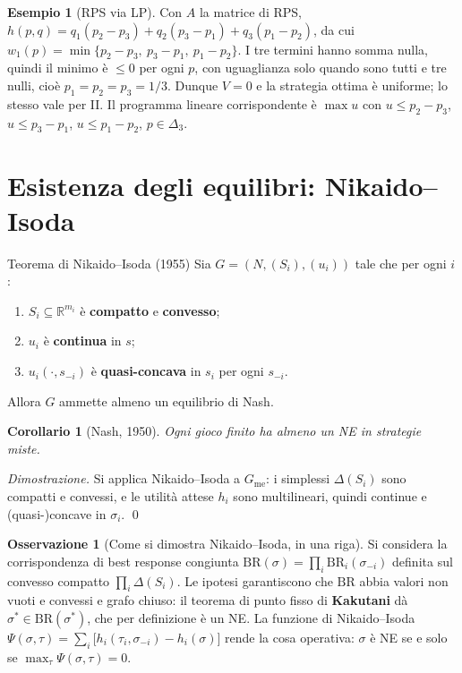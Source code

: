 \documentclass[12pt,a4paper,twoside]{book}
\theoremstyle{plain}
\newtheorem{corollary}[theorem]{Corollario}
\theoremstyle{definition}
\newtheorem{example}[theorem]{Esempio}
\newtheorem{remark}[theorem]{Osservazione}
\newcommand{\BR}{\mathrm{BR}}
\begin{document}
\begin{example}[RPS via LP]
Con $A$ la matrice di RPS,
$h(p,q)=q_1(p_2-p_3)+q_2(p_3-p_1)+q_3(p_1-p_2)$, da cui
$w_1(p)=\min\{p_2-p_3,\ p_3-p_1,\ p_1-p_2\}$. I tre termini hanno somma nulla,
quindi il minimo è $\le 0$ per ogni $p$, con uguaglianza solo quando sono tutti e
tre nulli, cioè $p_1=p_2=p_3=1/3$. Dunque $V=0$ e la strategia ottima è uniforme;
lo stesso vale per II. Il programma lineare corrispondente è
$\max u$ con $u\le p_2-p_3$, $u\le p_3-p_1$, $u\le p_1-p_2$, $p\in\Delta_3$.
\end{example}

\section{Esistenza degli equilibri: Nikaido--Isoda}

\begin{thmbox}{Teorema di Nikaido--Isoda (1955)}
Sia $G=(N,(S_i),(u_i))$ tale che per ogni $i$:
\begin{enumerate}
  \item $S_i\subseteq\mathbb{R}^{m_i}$ è \textbf{compatto} e \textbf{convesso};
  \item $u_i$ è \textbf{continua} in $s$;
  \item $u_i(\cdot,s_{-i})$ è \textbf{quasi-concava} in $s_i$ per ogni $s_{-i}$.
\end{enumerate}
Allora $G$ ammette almeno un equilibrio di Nash.
\end{thmbox}

\begin{corollary}[Nash, 1950]
Ogni gioco finito ha almeno un NE in strategie miste.
\end{corollary}
\textit{Dimostrazione.} Si applica Nikaido--Isoda a $G_{\mathrm{me}}$: i simplessi
$\Delta(S_i)$ sono compatti e convessi, e le utilità attese $h_i$ sono
multilineari, quindi continue e (quasi-)concave in $\sigma_i$. \qed

\begin{remark}[Come si dimostra Nikaido--Isoda, in una riga]
Si considera la corrispondenza di best response congiunta
$\BR(\sigma)=\prod_i \BR_i(\sigma_{-i})$ definita sul convesso compatto
$\prod_i\Delta(S_i)$. Le ipotesi garantiscono che $\BR$ abbia valori non vuoti e
convessi e grafo chiuso: il teorema di punto fisso di \textbf{Kakutani} dà
$\sigma^*\in\BR(\sigma^*)$, che per definizione è un NE. La funzione di
Nikaido--Isoda $\Psi(\sigma,\tau)=\sum_i\bigl[h_i(\tau_i,\sigma_{-i})-h_i(\sigma)\bigr]$
rende la cosa operativa: $\sigma$ è NE se e solo se $\max_\tau\Psi(\sigma,\tau)=0$.
\end{remark}
\end{document}
